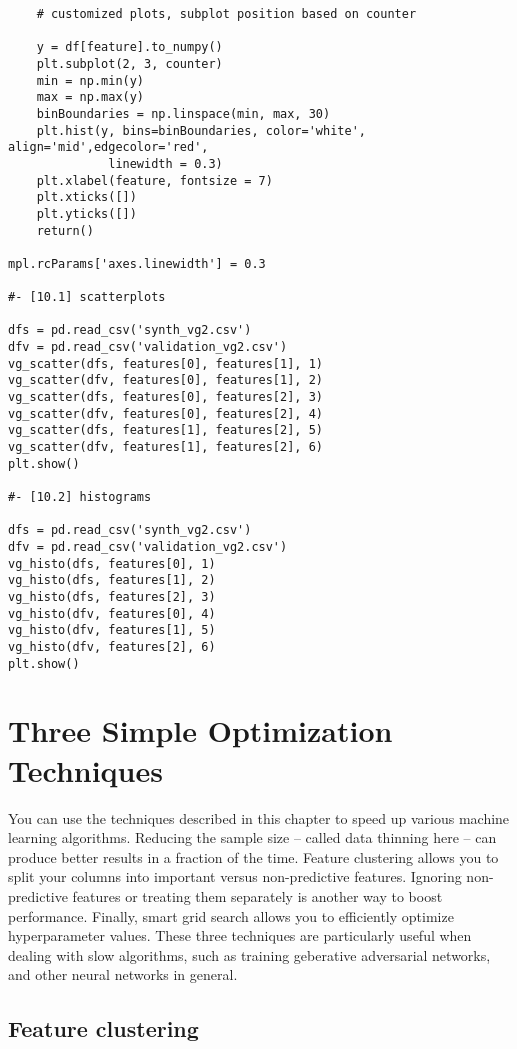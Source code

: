 \documentclass[oneside,10pt]{book}
\begin{document}
\begin{lstlisting}
    # customized plots, subplot position based on counter

    y = df[feature].to_numpy()
    plt.subplot(2, 3, counter)
    min = np.min(y)
    max = np.max(y)
    binBoundaries = np.linspace(min, max, 30)
    plt.hist(y, bins=binBoundaries, color='white', align='mid',edgecolor='red',
              linewidth = 0.3)
    plt.xlabel(feature, fontsize = 7)
    plt.xticks([])
    plt.yticks([])
    return()

mpl.rcParams['axes.linewidth'] = 0.3

#- [10.1] scatterplots

dfs = pd.read_csv('synth_vg2.csv')
dfv = pd.read_csv('validation_vg2.csv')
vg_scatter(dfs, features[0], features[1], 1)
vg_scatter(dfv, features[0], features[1], 2)
vg_scatter(dfs, features[0], features[2], 3)
vg_scatter(dfv, features[0], features[2], 4)
vg_scatter(dfs, features[1], features[2], 5)
vg_scatter(dfv, features[1], features[2], 6)
plt.show()

#- [10.2] histograms

dfs = pd.read_csv('synth_vg2.csv')
dfv = pd.read_csv('validation_vg2.csv')
vg_histo(dfs, features[0], 1)
vg_histo(dfs, features[1], 2)
vg_histo(dfs, features[2], 3)
vg_histo(dfv, features[0], 4)
vg_histo(dfv, features[1], 5)
vg_histo(dfv, features[2], 6)
plt.show()
\end{lstlisting}




\chapter{Three Simple Optimization Techniques}\label{3opt}

You can use the techniques described in this chapter to speed up various machine learning algorithms. Reducing the sample size -- called data thinning here -- can produce better results in a fraction of the time.  Feature clustering allows you to split your columns into important versus non-predictive features. Ignoring non-predictive features or treating them separately is another way to boost performance. Finally, smart grid search allows you to  efficiently optimize hyperparameter values. These three techniques are particularly useful when dealing with slow algorithms, such as training geberative adversarial networks, and other neural networks in general.

\section{Feature clustering}\label{fcvgfd}
\end{document}
